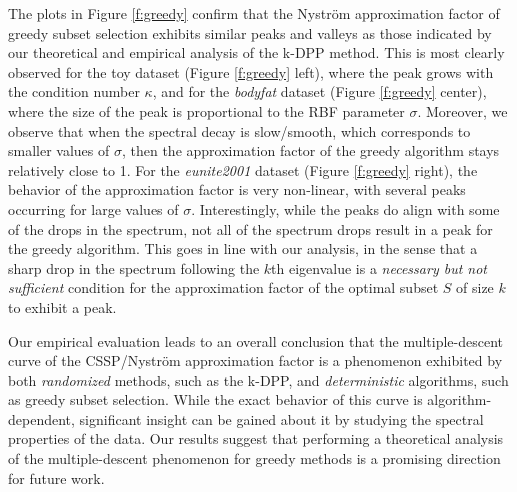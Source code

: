 \documentclass{article}
\begin{document}
The plots in Figure \ref{f:greedy} confirm that the
Nystr\"om approximation factor of greedy subset selection exhibits
similar peaks and valleys as those indicated by our theoretical and
empirical analysis of the k-DPP method. This is most clearly observed
for the toy dataset (Figure \ref{f:greedy} left), where the peak grows with the condition number
$\kappa$, and for the \emph{bodyfat} dataset (Figure \ref{f:greedy} center), where the size of the peak is
proportional to the RBF parameter $\sigma$. Moreover, we observe that
when the spectral decay is slow/smooth, which corresponds to smaller values
of $\sigma$, then the approximation factor of the greedy algorithm
stays relatively close to 1. For the \emph{eunite2001}
dataset (Figure \ref{f:greedy} right), the behavior of the approximation factor is very
non-linear, with several peaks occurring for large values of
$\sigma$. Interestingly, while the peaks do align with some of the
drops in the spectrum, not all of the spectrum drops result in a peak for the
greedy algorithm. This goes in line with our analysis, in the sense
that a sharp drop in the spectrum following the $k$th eigenvalue is a
\emph{necessary but not sufficient} condition for the approximation
factor of the optimal subset $S$ of size $k$ to exhibit a peak.

Our empirical evaluation leads to an overall conclusion that the
multiple-descent curve of the CSSP/Nystr\"om approximation factor is a
phenomenon exhibited by both \emph{randomized}
methods, such as the k-DPP, and \emph{deterministic}
algorithms, such as greedy subset selection. While the exact behavior
of this curve is algorithm-dependent, significant insight can be
gained about it by studying the spectral properties of the data. Our
results suggest that performing a theoretical analysis of
the multiple-descent phenomenon for greedy methods is a promising direction for future work.
 
  
\end{document}
